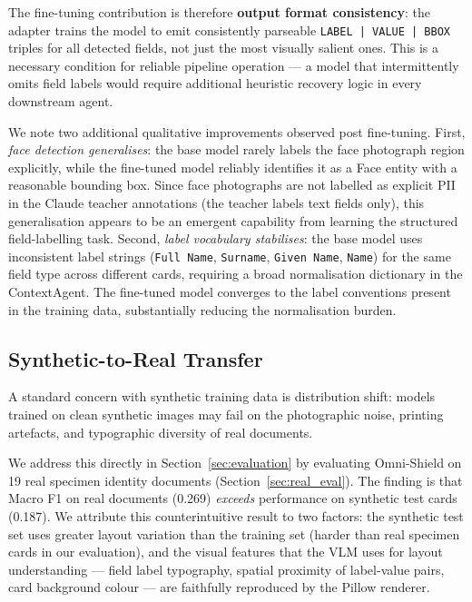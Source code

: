 \documentclass[conference]{IEEEtran}
\begin{document}
The fine-tuning contribution is therefore
\textbf{output format consistency}: the adapter
trains the model to emit consistently parseable
\texttt{LABEL\,|\,VALUE\,|\,BBOX} triples for all
detected fields, not just the most visually salient
ones.
This is a necessary condition for reliable pipeline
operation --- a model that intermittently omits field
labels would require additional heuristic recovery
logic in every downstream agent.

We note two additional qualitative improvements
observed post fine-tuning.
First, \emph{face detection generalises}: the base
model rarely labels the face photograph region
explicitly, while the fine-tuned model reliably
identifies it as a Face entity with a reasonable
bounding box.
Since face photographs are not labelled as explicit
PII in the Claude teacher annotations (the teacher
labels text fields only), this generalisation appears
to be an emergent capability from learning the
structured field-labelling task.
Second, \emph{label vocabulary stabilises}: the base
model uses inconsistent label strings (\texttt{Full
Name}, \texttt{Surname}, \texttt{Given Name},
\texttt{Name}) for the same field type across
different cards, requiring a broad normalisation
dictionary in the ContextAgent.
The fine-tuned model converges to the label
conventions present in the training data,
substantially reducing the normalisation burden.

\subsection{Synthetic-to-Real Transfer}

A standard concern with synthetic training data is
distribution shift: models trained on clean synthetic
images may fail on the photographic noise, printing
artefacts, and typographic diversity of real documents.

We address this directly in Section~\ref{sec:evaluation}
by evaluating Omni-Shield on 19 real specimen identity
documents (Section~\ref{sec:real_eval}).
The finding is that Macro F1 on real documents
(0.269) \emph{exceeds} performance on synthetic test
cards (0.187).
We attribute this counterintuitive result to two
factors: the synthetic test set uses greater layout
variation than the training set (harder than real
specimen cards in our evaluation), and the visual
features that the VLM uses for layout understanding
--- field label typography, spatial proximity of
label-value pairs, card background colour --- are
faithfully reproduced by the Pillow renderer.
\end{document}
